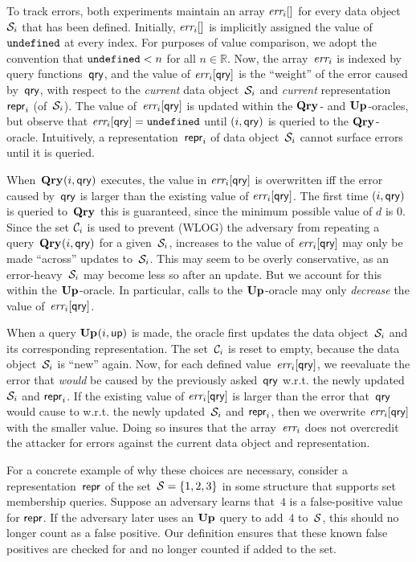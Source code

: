 To track errors, both experiments maintain an array $\textit{err}_i[]$ for every data object~$\mathcal{S}_i$ that has been defined.   Initially, $\textit{err}_i[]$ is implicitly assigned the value of~$\mathtt{undefined}$ at every index.  For purposes of value comparison, we adopt the convention that $\mathtt{undefined} < n$ for all $n \in \mathbb{R}$.
%
Now, the array~$\textit{err}_i$ is indexed by query functions~$\mathsf{qry}$, and the value of $\textit{err}_i[\mathsf{qry}]$ is the ``weight'' of the error caused by~$\mathsf{qry}$, with respect to the \emph{current} data object~$\mathcal{S}_i$ and \emph{current} representation~$\mathsf{repr}_i$ (of~$\mathcal{S}_i$).  
%
The value of~$\textit{err}_i[\mathsf{qry}]$ is updated within the $\mathbf{Qry}\hspace{0.5pt}$- and $\mathbf{Up}\hspace{0.5pt}$-oracles, but observe that $\textit{err}_i[\mathsf{qry}] = \mathtt{undefined}$ until $(i,\mathsf{qry})$ is queried to the $\mathbf{Qry}\hspace{0.5pt}$-oracle.  Intuitively, a representation~$\mathsf{repr}_i$ of data object~$\mathcal{S}_i$ cannot surface errors until it is queried.

When~$\mathbf{Qry}\hspace{0.5pt}(i,\mathsf{qry})$ executes, the value in $\textit{err}_i[\mathsf{qry}]$ is overwritten iff the error caused by~$\mathsf{qry}$ is larger than the existing value of $\textit{err}_i[\mathsf{qry}]$.  The first time $(i,\mathsf{qry})$ is queried to~$\mathbf{Qry}\hspace{0.5pt}$ this is guaranteed, since the minimum possible value of $d$ is 0.  Since the set $\mathcal{C}_i$ is used to prevent (WLOG) the adversary from repeating a query~$\mathbf{Qry}\hspace{0.5pt}(i,\mathsf{qry})$ for a given~$\mathcal{S}_i$, increases to the value of $\textit{err}_i[\mathsf{qry}]$ may only be made ``across'' updates to~$\mathcal{S}_i$.  This may seem to be overly conservative, as an error-heavy~$\mathcal{S}_i$ may become less so after an update.  But we account for this within the $\mathbf{Up}\hspace{0.5pt}$-oracle.
In particular, calls to the $\mathbf{Up}\hspace{0.5pt}$-oracle may only \emph{decrease} the value of~$\textit{err}_i[\mathsf{qry}]$.  

When a query $\mathbf{Up}\hspace{0.5pt}(i,\mathsf{up})$ is made, the oracle first updates the data object~$\mathcal{S}_i$ and its corresponding representation.  The set~$\mathcal{C}_i$ is reset to empty, because the data object~$\mathcal{S}_i$ is ``new'' again.
%
Now, for each defined value~$\textit{err}_i[\mathsf{qry}]$, we reevaluate the error that \emph{would} be caused by the previously asked~$\mathsf{qry}$ w.r.t. the newly updated $\mathcal{S}_i$ and $\mathsf{repr}_i$.  If the existing value of $\textit{err}_i[\mathsf{qry}]$ is larger than the error that~$\mathsf{qry}$ would cause to w.r.t. the newly updated~$\mathcal{S}_i$ and $\mathsf{repr}_i$, then we overwrite $\textit{err}_i[\mathsf{qry}]$ with the smaller value.  Doing so insures that the array~$\textit{err}_i$ does not overcredit the attacker for errors against the current data object and representation.

For a concrete example of why these choices are necessary, consider a representation~$\mathsf{repr}$ of the set~$\mathcal{S} = \{1,2,3\}$ in some structure that supports set membership queries. Suppose an adversary learns that~$4$ is a false-positive value for $\mathsf{repr}$. If the adversary later uses an $\mathbf{Up}\hspace{0.5pt}$ query to add~$4$ to~$\mathcal{S}$, this should no longer count as a false positive. Our definition ensures that these known false positives are checked for and no longer counted if added to the set.

